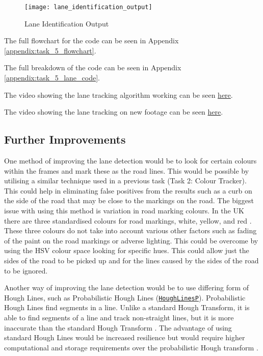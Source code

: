 \documentclass[conference]{IEEEtran}
\begin{document}
\begin{figure}[H]
\centerline{\texttt{[image: lane\_identification\_output]}}
\caption{Lane Identification Output}
\label{fig:lane_identification_output}
\end{figure}

The full flowchart for the code can be seen in Appendix \ref{appendix:task_5_flowchart}.

The full breakdown of the code can be seen in Appendix \ref{appendix:task_5_lane_code}.

The video showing the lane tracking algorithm working can be seen \href{https://youtu.be/Xw9haUy82Ps}{here}.

The video showing the lane tracking on new footage can be seen \href{https://youtu.be/3RjcQkaabNI}{here}.


\subsection{Further Improvements}

One method of improving the lane detection would be to look for certain colours within the frames and mark these as the road lines. This would be possible by utilising a similar technique used in a previous task (Task 2: Colour Tracker). This could help in eliminating false positives from the results such as a curb on the side of the road that may be close to the markings on the road. The biggest issue with using this method is variation in road marking colours. In the UK there are three standardised colours for road markings, white, yellow, and red \cite{road_markings}. These three colours do not take into account various other factors such as fading of the paint on the road markings or adverse lighting. This could be overcome by using the HSV colour space looking for specific hues. This could allow just the sides of the road to be picked up and  for the lines caused by the sides of the road to be ignored. 

Another way of improving the lane detection would be to use differing form of Hough Lines, such as Probabilistic Hough Lines (\href{https://docs.opencv.org/4.x/dd/d1a/group__imgproc__feature.html#ga8618180a5948286384e3b7ca02f6feeb}{\texttt{HoughLinesP}}). Probabilistic Hough Lines find segments in a line. Unlike a standard Hough Transform, it is able to find segments of a line and track non-straight lines, but it is more inaccurate than the standard Hough Transform \cite{hough_book}. The advantage of using standard Hough Lines would be increased resilience but would require higher computational and storage requirements over the probabilistic Hough transform \cite{improvement_to_hough_lines}. 
\end{document}
